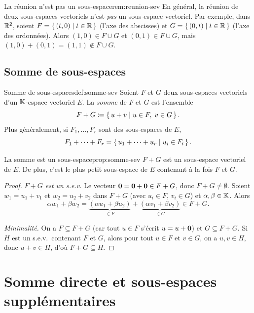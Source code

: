 \begin{remark}{La réunion n'est pas un sous-espace}{rem:reunion-sev}
  En général, la réunion de deux sous-espaces vectoriels n'est
  \emph{pas} un sous-espace vectoriel. Par exemple, dans ${\mathbb{R}}^2$, soient
  $F=\left\{\,(t,0)\;\middle|\;t\in{\mathbb{R}}\,\right\}$ (l'axe des abscisses) et
  $G=\left\{\,(0,t)\;\middle|\;t\in{\mathbb{R}}\,\right\}$ (l'axe des ordonnées). Alors
  $(1,0)\in F\cup G$ et $(0,1)\in F\cup G$, mais
  $(1,0)+(0,1)=(1,1)\notin F\cup G$.
\end{remark}

\subsection{Somme de sous-espaces}\label{subsec:somme}

\begin{definition}{Somme de sous-espaces}{def:somme-sev}
  Soient $F$ et $G$ deux sous-espaces vectoriels d'un ${\mathbb{K}}$-espace
  vectoriel $E$. La \emph{somme} de $F$ et $G$ est l'ensemble
  \[
    F+G \coloneqq \left\{\,u+v\;\middle|\;u\in F,\;v\in G\,\right\}.
  \]
  Plus généralement, si $F_1,\ldots,F_r$ sont des sous-espaces de $E$,
  \[
    F_1+\cdots+F_r = \left\{\,u_1+\cdots+u_r\;\middle|\;u_i\in F_i\,\right\}.
  \]
\end{definition}

\begin{proposition}{La somme est un sous-espace}{prop:somme-sev}
  $F+G$ est un sous-espace vectoriel de $E$. De plus, c'est le plus
  petit sous-espace de $E$ contenant à la fois $F$ et $G$.
\end{proposition}

\begin{proof}
  \emph{$F+G$ est un s.e.v.} Le vecteur $\mathbf{0}=\mathbf{0}+\mathbf{0}\in F+G$,
  donc $F+G\neq\emptyset$. Soient $w_1=u_1+v_1$ et $w_2=u_2+v_2$
  dans $F+G$ (avec $u_i\in F$, $v_i\in G$) et $\alpha,\beta\in{\mathbb{K}}$.
  Alors
  \[
    \alpha w_1+\beta w_2 =
    \underbrace{(\alpha u_1+\beta u_2)}_{\in F}+
    \underbrace{(\alpha v_1+\beta v_2)}_{\in G}\in F+G.
  \]

  \emph{Minimalité.} On a $F\subseteq F+G$ (car tout $u\in F$ s'écrit
  $u=u+\mathbf{0}$) et $G\subseteq F+G$. Si $H$ est un s.e.v.\ contenant
  $F$ et $G$, alors pour tout $u\in F$ et $v\in G$, on a $u,v\in H$,
  donc $u+v\in H$, d'où $F+G\subseteq H$.
\end{proof}

\section{Somme directe et sous-espaces supplémentaires}\label{sec:somme-directe}

